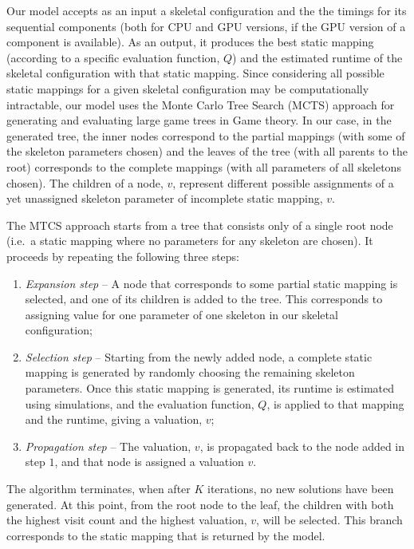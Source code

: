 \documentclass[smallextended]{svjour3}
\begin{document}
Our model accepts as an input a skeletal configuration and the
the timings for its sequential components (both for CPU and
GPU versions, if the GPU version of a component is available). As an
output, it produces the best static mapping (according to a specific
evaluation function, $Q$) and the estimated runtime of the skeletal
configuration with that static mapping. Since considering all possible static mappings for a given
skeletal configuration may be computationally intractable, our model
uses the Monte Carlo Tree Search (MCTS) approach for generating and
evaluating large game trees in Game theory. In our case, in the
generated tree,  the inner nodes correspond to the partial mappings (with some of the
skeleton parameters chosen) and the leaves of the tree (with all parents to the root) corresponds to
the complete mappings (with all parameters of all skeletons
chosen). The children of a node, $v$, represent different possible
assignments of a yet unassigned skeleton parameter of incomplete
static mapping, $v$.

The MTCS approach starts from a tree that consists only of a
single 
root node (i.e.\ a static mapping where no
parameters for any skeleton are chosen). It proceeds by repeating the following three steps: 
\begin{enumerate}
\item \emph{Expansion step} -- A node that corresponds to some
  partial static mapping is selected, and one of its children is
  added to the tree. This corresponds to assigning value for one
  parameter of one skeleton in our skeletal configuration;
\item \emph{Selection step} -- Starting from the newly added node, a
  complete static mapping is generated by randomly choosing the
  remaining skeleton parameters. Once this static mapping is
  generated, its runtime is estimated using simulations, and the
  evaluation function, $Q$, is applied to that mapping and the runtime,
  giving a valuation, $v$;
\item \emph{Propagation step} -- The valuation, $v$, is propagated back
  to the node added in step $1$, and that node is assigned a valuation
  $v$. 
\end{enumerate}

The algorithm terminates, when after $K$ iterations, no new solutions have been generated.
At this point, from the root node to the leaf,
the children with both the highest 
visit count and the highest valuation, $v$, will be selected. This branch corresponds to the static mapping that is returned by the model.
\end{document}
